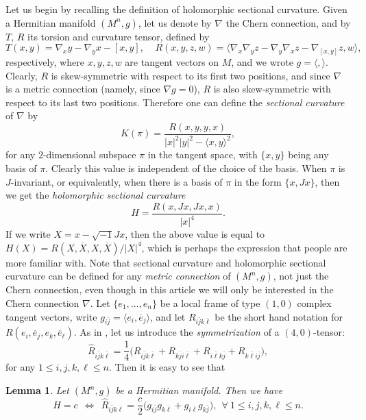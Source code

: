 \documentclass{amsart}
\newtheorem{lemma}{Lemma}
\begin{document}
Let us begin by recalling the definition of holomorphic sectional curvature. Given a Hermitian manifold $(M^n,g)$, let us denote by $\nabla$ the Chern connection, and by $T$, $R$ its torsion and curvature tensor, defined by
$$ T(x,y)=\nabla_xy-\nabla_yx-[x,y], \ \ \ \ \ R(x,y,z,w)=\langle \nabla_x\nabla_yz - \nabla_y\nabla_x z -\nabla_{[x,y]}z , w\rangle ,\ \ \ $$
respectively, where $x,y,z,w$ are tangent vectors on $M$, and we wrote $g=\langle , \rangle$.  Clearly, $R$ is skew-symmetric with respect to its first two positions, and since $\nabla$ is a metric connection (namely, since $\nabla g=0$), $R$ is also skew-symmetric with respect to its last two positions. Therefore one can define the {\em sectional curvature} of $\nabla$ by
$$ K(\pi ) = \frac{ R(x,y,y,x)}{|x|^2|y|^2 - \langle x,y\rangle ^2}, $$
for any $2$-dimensional subspace $\pi$ in the tangent space, with $\{ x,y\}$ being any basis of $\pi$. Clearly this value is independent of the choice of the basis. When $\pi$ is $J$-invariant, or equivalently, when there is a basis of $\pi$ in the form $\{ x, Jx\}$, then we get the {\em holomorphic sectional curvature}
$$ H = \frac{R(x,Jx,Jx,x)}{|x|^4}. $$
If we write $X=x-\sqrt{-1}Jx$, then the above value is equal to $H(X) = R(X, \overline{X}, X, \overline{X})/|X|^4$, which is perhaps the expression that people are more familiar with. Note that sectional curvature and holomorphic sectional curvature can be defined for any {\em metric connection} of $(M^n,g)$, not just the Chern connection, even though in this article we will only be interested in the Chern connection $\nabla$. Let $\{ e_1, \ldots , e_n\}$ be a local frame of type $(1,0)$ complex tangent vectors, write $g_{i\bar{j}}=\langle e_i, \overline{e}_j\rangle$, and let $R_{i\bar{j}k\bar{\ell}} $ be the short hand notation for $R(e_i, \overline{e}_j, e_k, \overline{e}_{\ell})$. As in \cite{LZ}, let us introduce the {\em symmetrization} of a $(4,0)$-tensor:
$$ \widehat{R}_{i\bar{j}k\bar{\ell}} = \frac{1}{4} \big( R_{i\bar{j}k\bar{\ell}} + R_{k\bar{j}i\bar{\ell}} + R_{i\bar{\ell}k\bar{j}} + R_{k\bar{\ell}i\bar{j}} \big) , $$
for any $1\leq i,j,k,\ell \leq n$. Then it is easy to see that

\begin{lemma} \label{lemma1}
Let $(M^n,g)$ be a Hermitian manifold. Then we have
$$ H=c \ \  \Longleftrightarrow \ \ \widehat{R}_{i\bar{j}k\bar{\ell}} = \frac{c}{2}\big( g_{i\bar{j}} g_{k\bar{\ell}} + g_{i\bar{\ell }} g_{k\bar{j}}  \big) , \ \ \forall \ 1\leq i,j,k,\ell \leq n. $$
\end{lemma}
\end{document}
